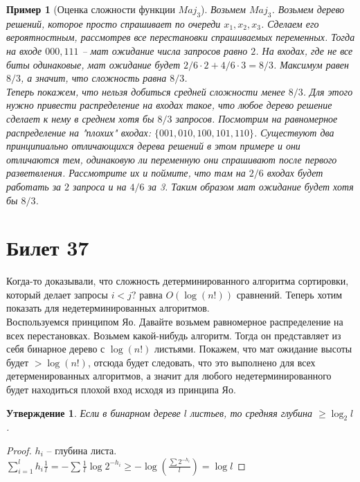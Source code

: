 \documentclass[12pt, letterpaper]{article}
\newtheorem{prop}{Утверждение}[section]
\newtheorem{sample}{Пример}[section]
\begin{document}
\begin{sample}[Оценка сложности функции $Maj_3$]
Возьмем $Maj_3$. Возьмем дерево решений, которое просто спрашивает по очереди $x_1, x_2, x_3$. Сделаем его вероятностным, рассмотрев все перестановки спрашиваемых переменных. Тогда на входе $000, 111$ -- мат ожидание числа запросов равно $2$. На входах, где не все биты одинаковые, мат ожидание будет $2/6 \cdot 2 + 4/6 \cdot 3 = 8/3$. Максимум равен $8/3$, а значит, что сложность равна $8/3$.\\
Теперь покажем, что нельзя добиться средней сложности менее $8/3$. Для этого нужно привести распределение на входах такое, что любое дерево решение сделает к нему в среднем хотя бы $8/3$ запросов. Посмотрим на равномерное распределение на "плохих" входах: $\{001, 010, 100, 101, 110\}$. Существуют два принципиально отличающихся дерева решений в этом примере и они отличаются тем, одинаковую ли переменную они спрашивают после первого разветвления. Рассмотрите их и поймите, что там на $2/6$ входах будет работать за $2$ запроса и на $4/6$ за 3. Таким образом мат ожидание будет хотя бы $8/3$.
\end{sample}

\section{Билет 37}
Когда-то доказывали, что сложность детерминированного алгоритма сортировки, который делает запросы $i < j?$ равна $O(\log (n!))$ сравнений. Теперь хотим показать для недетерминированных алгоритмов.\\
Воспользуемся принципом Яо. Давайте возьмем равномерное распределение на всех перестановках. Возьмем какой-нибудь алгоритм. Тогда он представляет из себя бинарное дерево с $\log(n!)$ листьями. Покажем, что мат ожидание высоты будет $>\log(n!)$, отсюда будет следовать, что это выполнено для всех детерменированных алгоритмов, а значит для любого недетерминированного будет находиться плохой вход исходя из принципа Яо.\\
\begin{prop}
Если в бинарном дереве $l$ листьев, то средняя глубина $\geq \log_2 l$.
\end{prop}
\begin{proof}
$h_i$ -- глубина листа. \\
$\sum_{i=1}^l h_i \frac{1}{l} = -\sum \frac1{l} \log 2^{-h_i} \geq -\log(\frac{\sum 2^{-h_i}}{l}) = \log l$
\end{proof}
\end{document}
